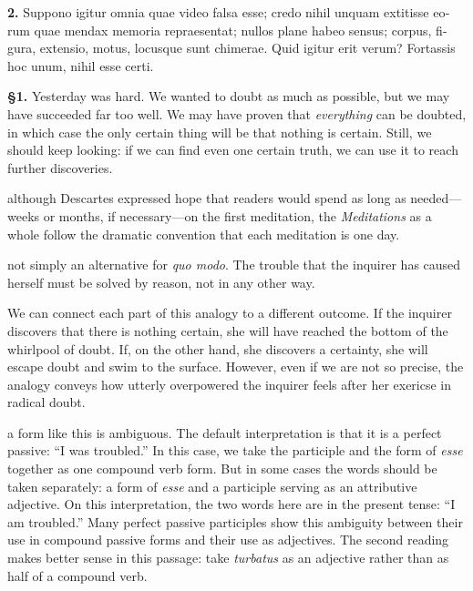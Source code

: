 \beginnumbering
\pstart
\begin{latin}
    \textenglish{\textbf{2.}} Suppono igitur omnia quae video falsa esse; credo nihil unquam extitisse eorum quae mendax memoria repraesentat; nullos plane habeo sensus; corpus, figura, extensio, motus, locusque sunt chimerae. Quid igitur erit verum? Fortassis hoc unum, nihil esse certi.
\end{latin}
\pend
\endnumbering

\prenotes

\textbf{§1.} Yesterday was hard. We wanted to doubt as much as possible, but we may have succeeded far too well. We may have proven that \textit{everything} can be doubted, in which case the only certain thing will be that nothing is certain. Still, we should keep looking: if we can find even one certain truth, we can use it to reach further discoveries.

 although Descartes expressed hope that readers would spend as long as needed---weeks or months, if necessary---on the first meditation, the \textit{Meditations} as a whole follow the dramatic convention that each meditation is one day.

 not simply an alternative for \textit{quo modo}. The trouble that the inquirer has caused herself must be solved by reason, not in any other way.

 We can connect each part of this analogy to a different outcome. If the inquirer discovers that there is nothing certain, she will have reached the bottom of the whirlpool of doubt. If, on the other hand, she discovers a certainty, she will escape doubt and swim to the surface. However, even if we are not so precise, the analogy conveys how utterly overpowered the inquirer feels after her exericse in radical doubt.

 a form like this is ambiguous. The default interpretation is that it is a perfect passive: ``I was troubled.'' In this case, we take the participle and the form of \textit{esse} together as one compound verb form. But in some cases the words should be taken separately: a form of \textit{esse} and a participle serving as an attributive adjective. On this interpretation, the two words here are in the present tense: ``I am troubled.'' Many perfect passive participles show this ambiguity between their use in compound passive forms and their use as adjectives. The second reading makes better sense in this passage: take \textit{turbatus} as an adjective rather than as half of a compound verb.

